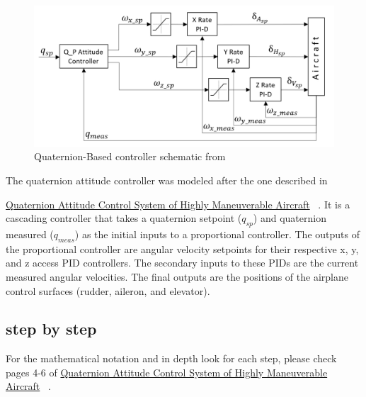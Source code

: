\documentclass[11pt]{scrartcl} %
\begin{document}
\begin{figure}[ht!] %
	\centering
	\includegraphics[width=0.9\columnwidth]{QuatSchematicPID.png} 
	\caption{Quaternion-Based controller schematic from ~\cite{quat}}
\end{figure}

The quaternion attitude controller was modeled after the one described in 

\underline{Quaternion Attitude Control System of Highly Maneuverable Aircraft} ~\cite{quat}. It is a cascading controller that takes a quaternion setpoint ($q_{sp}$) and quaternion measured ($q_{meas}$) as the initial inputs to a proportional controller. The outputs of the proportional controller are angular velocity setpoints for their respective x, y, and z access PID controllers. The secondary inputs to these PIDs are the current measured angular velocities. The final outputs are the positions of the airplane control surfaces (rudder, aileron, and elevator).

\subsection{step by step}
For the mathematical notation and in depth look for each step, please check pages 4-6 of \underline{Quaternion Attitude Control System of Highly Maneuverable Aircraft} ~\cite{quat}. 
\end{document}
